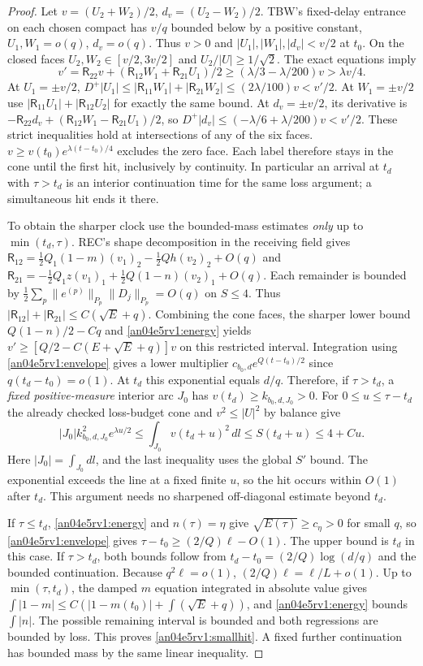 \documentclass[11pt]{article}
\newcommand{\dd}{\,dl}
\begin{document}
\begin{proof}
Let $v=(U_2+W_2)/2$, $d_v=(U_2-W_2)/2$. TBW's fixed-delay entrance on each chosen compact has $v/q$ bounded below by a positive constant, $U_1,W_1=o(q)$, $d_v=o(q)$. Thus $v>0$ and $|U_1|,|W_1|,|d_v|<v/2$ at $t_0$. On the closed faces $U_2,W_2\in[v/2,3v/2]$ and $U_2/|U|\ge1/\sqrt2$. The exact equations imply
\[
 v'=\mathsf R_{22}v+(\mathsf R_{12}W_1+\mathsf R_{21}U_1)/2
 \ge(\lambda/3-\lambda/200)v>\lambda v/4 .
\]
At $U_1=\pm v/2$, $D^+|U_1|\le |\mathsf R_{11}W_1|+|\mathsf R_{21}W_2|\le(2\lambda/100)v<v'/2$. At $W_1=\pm v/2$ use $|\mathsf R_{11}U_1|+|\mathsf R_{12}U_2|$ for exactly the same bound. At $d_v=\pm v/2$, its derivative is $-\mathsf R_{22}d_v+(\mathsf R_{12}W_1-\mathsf R_{21}U_1)/2$, so $D^+|d_v|\le(-\lambda/6+\lambda/200)v<v'/2$. These strict inequalities hold at intersections of any of the six faces. $v\ge v(t_0)e^{\lambda(t-t_0)/4}$ excludes the zero face. Each label therefore stays in the cone until the first hit, inclusively by continuity. In particular an arrival at $t_d$ with $\tau>t_d$ is an interior continuation time for the same loss argument; a simultaneous hit ends it there.

To obtain the sharper clock use the bounded-mass estimates \emph{only} up to $\min(t_d,\tau)$. REC's shape decomposition in the receiving field gives
$\mathsf R_{12}=\tfrac12Q_1(1-m)(v_1)_2-\tfrac12 Q h(v_2)_2+O(q)$ and
$\mathsf R_{21}=-\tfrac12Q_1 z(v_1)_1+\tfrac12Q(1-n)(v_2)_1+O(q)$.
Each remainder is bounded by $\frac12\sum_p\|e^{(p)}\|_{P_p}\|D_j\|_{P_p}=O(q)$ on $S\le4$. Thus $|\mathsf R_{12}|+|\mathsf R_{21}|\le C(\sqrt E+q)$. Combining the cone faces, the sharper lower bound $Q(1-n)/2-Cq$ and \eqref{an04e5rv1:energy} yields
$v'\ge[Q/2-C(E+\sqrt E+q)]v$ on this restricted interval. Integration using \eqref{an04e5rv1:envelope} gives a lower multiplier $c_{b_0,d}e^{Q(t-t_0)/2}$ since $q(t_d-t_0)=o(1)$. At $t_d$ this exponential equals $d/q$. Therefore, if $\tau>t_d$, a \emph{fixed positive-measure} interior arc $J_0$ has $v(t_d)\ge k_{b_0,d,J_0}>0$. For $0\le u\le\tau-t_d$ the already checked loss-budget cone and $v^2\le |U|^2$ by balance give
\[
 |J_0|k_{b_0,d,J_0}^2 e^{\lambda u/2}
 \le\int_{J_0}v(t_d+u)^2\dd\le S(t_d+u)\le4+Cu .
\]
Here $|J_0|=\int_{J_0}dl$, and the last inequality uses the global $S'$ bound. The exponential exceeds the line at a fixed finite $u$, so the hit occurs within $O(1)$ after $t_d$. This argument needs no sharpened off-diagonal estimate beyond $t_d$.

If $\tau\le t_d$, \eqref{an04e5rv1:energy} and $n(\tau)=\eta$ give $\sqrt{E(\tau)}\ge c_\eta>0$ for small $q$, so \eqref{an04e5rv1:envelope} gives $\tau-t_0\ge(2/Q)\ell-O(1)$. The upper bound is $t_d$ in this case. If $\tau>t_d$, both bounds follow from $t_d-t_0=(2/Q)\log(d/q)$ and the bounded continuation. Because $q^2\ell=o(1)$, $(2/Q)\ell=\ell/L+o(1)$. Up to $\min(\tau,t_d)$, the damped $m$ equation integrated in absolute value gives $\int |1-m|\le C(|1-m(t_0)|+\int(\sqrt E+q))$, and \eqref{an04e5rv1:energy} bounds $\int |n|$. The possible remaining interval is bounded and both regressions are bounded by loss. This proves \eqref{an04e5rv1:smallhit}. A fixed further continuation has bounded mass by the same linear inequality.
\end{proof}
\end{document}

